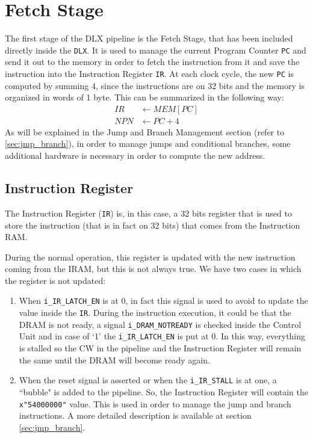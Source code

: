 \chapter{Fetch Stage}
The first stage of the DLX pipeline is the Fetch Stage, that has been included directly inside the \texttt{DLX}. It is used to manage the current Program Counter \texttt{PC} and send it out to the memory in order to fetch the instruction from it and save the instruction into the Instruction Register \texttt{IR}. At each clock cycle, the new \texttt{PC} is computed by summing 4, since the instructions are on 32 bits and the memory is organized in words of 1 byte. This can be summarized in the following way:
\begin{align*}
	IR &\leftarrow MEM[PC]\\
	NPN &\leftarrow PC + 4
\end{align*}
As will be explained in the Jump and Branch Management section (refer to \ref{sec:jmp_branch}), in order to manage jumps and conditional branches, some additional hardware is necessary in order to compute the new address.

\section{Instruction Register}
The Instruction Register (\texttt{IR}) is, in this case, a 32 bits register that is used to store the instruction (that is in fact on 32 bits) that comes from the Instruction RAM.

During the normal operation, this register is updated with the new instruction coming from the IRAM, but this is not always true. We have two cases in which the register is not updated:
\begin{enumerate}
	\item When \texttt{i\_IR\_LATCH\_EN} is at 0, in fact this signal is used to avoid to update the value inside the \texttt{IR}. During the instruction execution, it could be that the DRAM is not ready, a signal \texttt{i\_DRAM\_NOTREADY} is checked inside the Control Unit and in case of `1' the \texttt{i\_IR\_LATCH\_EN} is put at 0. In this way, everything is stalled so the CW in the pipeline and the Instruction Register will remain the same until the DRAM will become ready again. 
	\item When the reset signal is asserted or when the \texttt{i\_IR\_STALL} is at one, a ``bubble" is added to the pipeline. So, the Instruction Register will contain the \texttt{x"54000000"} value. This is used in order to manage the jump and branch instructions. A more detailed description is available at section \ref{sec:jmp_branch}.
\end{enumerate}

